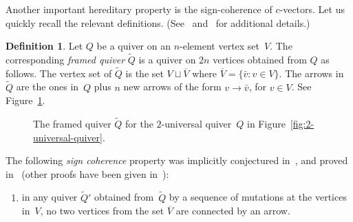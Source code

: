 \documentclass[10pt]{amsart}
\theoremstyle{definition}
\newtheorem{definition}[theorem]{Definition}
\begin{document}

Another important %
hereditary property is the sign-coherence of $c$-vectors. 
Let us quickly recall the relevant definitions. 
(See~\cite{nakanishi-zelevinsky} and~\cite{ca4, keller-fpsac13} for additional details.)

\begin{definition}
Let $Q$ be a quiver on an $n$-element vertex set~$V$. 
The corresponding \emph{framed quiver} $\widetilde Q$ is a quiver on $2n$ vertices
obtained from $Q$ as follows. 
The vertex set of $\widetilde Q$ is the set $V\sqcup \overline V$ where 
$\overline V=\{\bar v:v\in V\}$. The arrows in $\widetilde Q$ are the ones in~$Q$ plus 
$n$ new arrows of the form $v\to \bar v$, for $v\in V$. 
See Figure~\ref{fig:2-universal-quiver-framed}. 
\end{definition}

\begin{figure}[ht]\centering

\caption{The framed quiver $\widetilde Q$ for the $2$-universal quiver~$Q$ in Figure~\ref{fig:2-universal-quiver}. }
\label{fig:2-universal-quiver-framed}
\end{figure}


The following \emph{sign coherence} property was implicitly conjectured in~\cite{ca4}, and proved in~\cite{DWZ2}
(other proofs have been given in~\cite{GHKK, Nagao}):
\begin{enumerate}[label=(SC)]
\item\label{SC} %
in any quiver $\widetilde Q'$ obtained from~$\widetilde Q$ by a sequence of mutations
at the vertices in~$V$, 
no two vertices from the set $\overline V$ are connected by an arrow. 
\end{enumerate}
\end{document}
